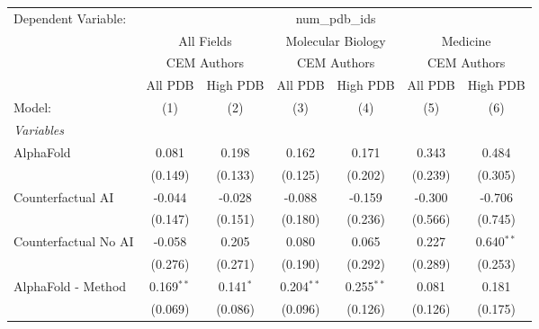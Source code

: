\begingroup
\centering
\begin{tabular}{lcccccc}
   \tabularnewline \midrule \midrule
   Dependent Variable: & \multicolumn{6}{c}{num\_pdb\_ids}\\
 & \multicolumn{2}{c}{All Fields} & \multicolumn{2}{c}{Molecular Biology} & \multicolumn{2}{c}{Medicine} \\
\cmidrule(lr){2-3} \cmidrule(lr){4-5} \cmidrule(lr){6-7}
 & \multicolumn{2}{c}{CEM Authors} & \multicolumn{2}{c}{CEM Authors} & \multicolumn{2}{c}{CEM Authors} \\
\cmidrule(lr){2-3} \cmidrule(lr){4-5} \cmidrule(lr){6-7}
 & \multicolumn{1}{c}{All PDB} & \multicolumn{1}{c}{High PDB} & \multicolumn{1}{c}{All PDB} & \multicolumn{1}{c}{High PDB} & \multicolumn{1}{c}{All PDB} & \multicolumn{1}{c}{High PDB} \\
\cmidrule(lr){2-2} \cmidrule(lr){3-3} \cmidrule(lr){4-4} \cmidrule(lr){5-5} \cmidrule(lr){6-6} \cmidrule(lr){7-7}
   Model:                                                     & (1)          & (2)          & (3)          & (4)          & (5)          & (6)\\  
   \midrule
   \emph{Variables}\\
   AlphaFold                                                  & 0.081        & 0.198        & 0.162        & 0.171        & 0.343        & 0.484\\   
                                                              & (0.149)      & (0.133)      & (0.125)      & (0.202)      & (0.239)      & (0.305)\\   
   Counterfactual AI                                          & -0.044       & -0.028       & -0.088       & -0.159       & -0.300       & -0.706\\   
                                                              & (0.147)      & (0.151)      & (0.180)      & (0.236)      & (0.566)      & (0.745)\\   
   Counterfactual No AI                                       & -0.058       & 0.205        & 0.080        & 0.065        & 0.227        & 0.640$^{**}$\\   
                                                              & (0.276)      & (0.271)      & (0.190)      & (0.292)      & (0.289)      & (0.253)\\   
   AlphaFold - Method                                         & 0.169$^{**}$ & 0.141$^{*}$  & 0.204$^{**}$ & 0.255$^{**}$ & 0.081        & 0.181\\   
                                                              & (0.069)      & (0.086)      & (0.096)      & (0.126)      & (0.126)      & (0.175)\\   

\end{tabular}
